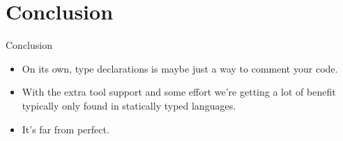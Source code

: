 \documentclass{beamer}
\begin{document}
\section{Conclusion}

\begin{frame}{Conclusion}

  \begin{itemize}[<+->]
  \item On its own, type declarations is maybe just a way to comment
    your code.
  \item With the extra tool support and some effort we're getting a
    lot of benefit typically only found in statically typed languages.
  \item It's far from perfect.
  \end{itemize}

\end{frame}
\end{document}
